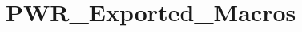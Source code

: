 \hypertarget{group__PWR__Exported__Macros}{
\section{PWR\_\-Exported\_\-Macros}
\label{group__PWR__Exported__Macros}
}
